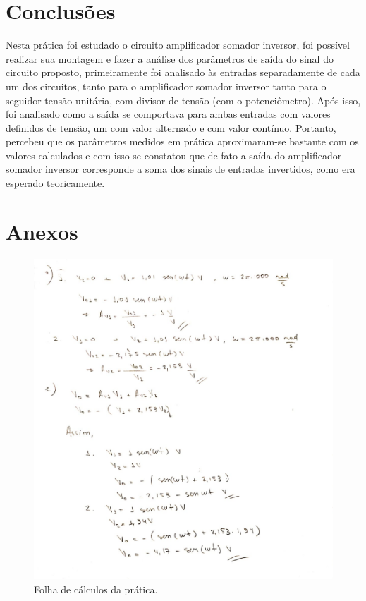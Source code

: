 \section{Conclusões}

Nesta prática foi estudado o circuito amplificador somador inversor, foi possível realizar sua montagem e fazer a análise dos parâmetros de saída do sinal do circuito proposto, primeiramente foi analisado às entradas separadamente de cada um dos circuitos, tanto para o amplificador somador inversor tanto para o seguidor tensão unitária, com divisor de tensão (com o potenciômetro). Após isso, foi analisado como a saída se comportava para ambas entradas com valores definidos de tensão, um com valor alternado e com valor contínuo. Portanto, percebeu que os parâmetros medidos em prática aproximaram-se bastante com os valores calculados e com isso se constatou que de fato a saída do amplificador somador inversor corresponde a soma dos sinais de entradas invertidos, como era esperado teoricamente. 

\newpage

\section{Anexos}

\begin{figure}[H] 
\includegraphics[scale=0.4]{imagens/calc.jpg} 
\centering
\caption{Folha de cálculos da prática.}
\label{p5-2} 
\end{figure} 




     






